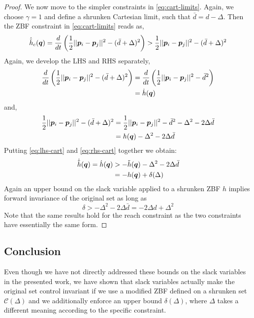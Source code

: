 \begin{proof}
We now move to the simpler constraints in \eqref{eq:cart-limits}. Again, we choose $\gamma=1$ and define a shrunken Cartesian limit, such that $\bar{d} = d - \Delta$. Then the ZBF constraint in \eqref{eq:cart-limits} reads as,
\begin{equation}
    \dot{\tilde{h}}_c(\bm{q}) = \frac{d}{dt}\left( \frac{1}{2} ||\bm{p}_{i} - \bm{p}_{j}||^2 - (\bar{d}+ 
    \Delta)^2\right) > \frac{1}{2} ||\bm{p}_{i} - \bm{p}_{j}||^2 - (\bar{d}+ 
    \Delta)^2
\end{equation}
Again, we develop the LHS and RHS separately,
\begin{align} \label{eq:lhs-cart}
     \frac{d}{dt}\left( \frac{1}{2} ||\bm{p}_{i} - \bm{p}_{j}||^2 - (\bar{d}+ 
    \Delta)^2\right) &= \frac{d}{dt}\left( \frac{1}{2} ||\bm{p}_{i} - \bm{p}_{j}||^2 - \bar{d}^2\right) \\
    &= \dot{h}(\bm{q})
\end{align}
and,
\begin{align} \label{eq:rhs-cart}
    \frac{1}{2} ||\bm{p}_{i} - \bm{p}_{j}||^2 - (\bar{d}+ 
    \Delta)^2 &= \frac{1}{2} ||\bm{p}_{i} - \bm{p}_{j}||^2 - \bar{d}^2- 
    \Delta^2 - 2\Delta\bar{d} \\
    &= h(\bm{q}) - \Delta^2 - 2\Delta\bar{d} 
\end{align}
Putting \ref{eq:lhs-cart} and \ref{eq:rhs-cart} together we obtain:
\begin{align}
    \dot{\tilde{h}}(\bm{q}) = \dot{h}(\bm{q}) &> -\tilde{h}(\bm{q}) - \Delta^2 - 2\Delta\bar{d} \\ 
    &= -h(\bm{q}) + \delta(\Delta)
\end{align}
Again an upper bound on the slack variable applied to a shrunken ZBF $h$ implies forward invariance of the original set as long as
\begin{equation}
    \delta > -\Delta^2 - 2\Delta\bar{d} = -2\Delta d + \Delta^2
\end{equation}
Note that the same results hold for the reach constraint as the two constraints have essentially the same form.
\end{proof}

\subsection{Conclusion}
Even though we have not directly addressed these bounds on the slack variables in the presented work, we have shown that slack variables actually make the original set control invariant if we use a modified ZBF defined on a shrunken set  $\mathcal{C}(\Delta)$ and we additionally enforce an upper bound $\delta(\Delta)$, where $\Delta$ takes a different meaning according to the specific constraint. 
